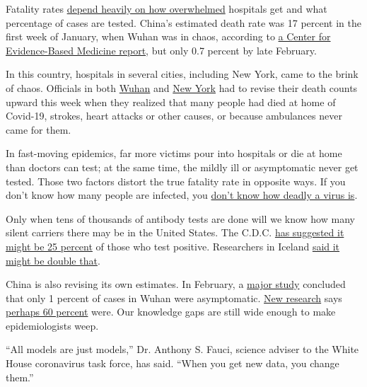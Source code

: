 Fatality rates
\href{https://www.nytimes.com/2020/04/10/nyregion/new-york-coronavirus-death-count.html}{depend
heavily on how overwhelmed} hospitals get and what percentage of cases
are tested. China's estimated death rate was 17 percent in the first
week of January, when Wuhan was in chaos, according to
\href{https://www.cebm.net/covid-19/global-covid-19-case-fatality-rates/}{a
Center for Evidence-Based Medicine report}, but only 0.7 percent by late
February.

In this country, hospitals in several cities, including New York, came
to the brink of chaos. Officials in both
\href{https://www.nytimes.com/2020/04/17/world/coronavirus-news.html\#link-f029419}{Wuhan}
and
\href{https://www.nytimes.com/2020/04/14/nyregion/new-york-coronavirus-deaths.html}{New
York} had to revise their death counts upward this week when they
realized that many people had died at home of Covid-19, strokes, heart
attacks or other causes, or because ambulances never came for them.

In fast-moving epidemics, far more victims pour into hospitals or die at
home than doctors can test; at the same time, the mildly ill or
asymptomatic never get tested. Those two factors distort the true
fatality rate in opposite ways. If you don't know how many people are
infected, you
\href{https://www.nytimes.com/2020/04/17/us/coronavirus-death-rate.html}{don't
know how deadly a virus is}.

Only when tens of thousands of antibody tests are done will we know how
many silent carriers there may be in the United States. The C.D.C.
\href{https://www.nytimes.com/2020/03/31/health/coronavirus-asymptomatic-transmission.html}{has
suggested it might be 25 percent} of those who test positive.
Researchers in Iceland
\href{https://www.cnn.com/2020/04/01/europe/iceland-testing-coronavirus-intl/index.html}{said
it might be double that}.

China is also revising its own estimates. In February, a
\href{https://jamanetwork.com/journals/jama/fullarticle/2762130}{major
study} concluded that only 1 percent of cases in Wuhan were
asymptomatic.
\href{https://www.scmp.com/news/china/society/article/3080058/coronavirus-china-launches-study-asymptomatic-cases-and-shared}{New
research} says
\href{https://www.scmp.com/news/china/society/article/3079012/coronavirus-68-cent-cases-confirmed-china-past-eight-days-had-no}{perhaps
60 percent} were. Our knowledge gaps are still wide enough to make
epidemiologists weep.

``All models are just models,'' Dr. Anthony S. Fauci, science adviser to
the White House coronavirus task force, has said. ``When you get new
data, you change them.''

